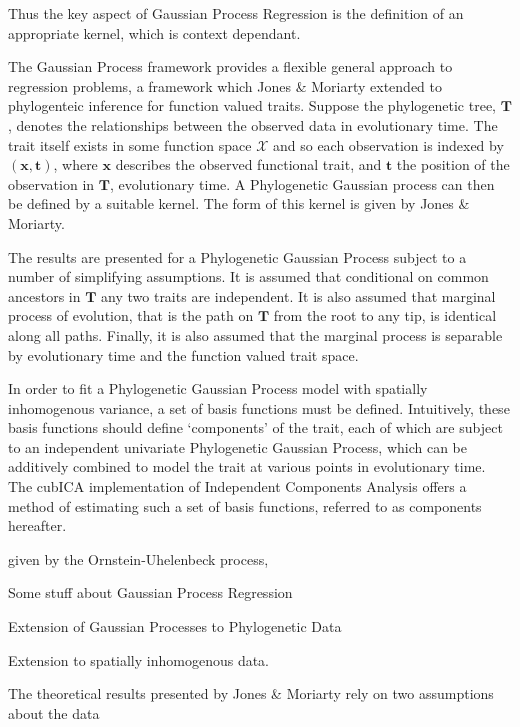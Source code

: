 \documentclass[wsdraft]{ws-rv9x6} %
\begin{document}
Thus the key aspect of Gaussian Process Regression is the definition of an appropriate kernel, which is context dependant. 

The Gaussian Process framework provides a flexible general approach to regression problems, a framework which Jones \& Moriarty extended to phylogenteic inference for function valued traits. Suppose the phylogenetic tree, \(\mathbf{T}\), denotes the relationships between the observed data in evolutionary time. The trait itself exists in some function space \(\mathcal{X}\) and so each observation is indexed by \((\mathbf{x}, \mathbf{t})\), where \(\mathbf{x}\) describes the observed functional trait, and \(\mathbf{t}\) the position of the observation in \(\mathbf{T}\), evolutionary time. A Phylogenetic Gaussian process can then be defined by a suitable kernel. The form of this kernel is given by Jones \& Moriarty.\cite{jones2013evolutionary}

The results are presented for a Phylogenetic Gaussian Process subject to a number of simplifying assumptions. It is assumed that conditional on common ancestors in \(\mathbf{T}\) any two traits are independent. It is also assumed that marginal process of evolution, that is the path on \(\mathbf{T}\) from the root to any tip, is identical along all paths. Finally, it is also assumed that the marginal process is separable by evolutionary time and the function valued trait space.

In order to fit a Phylogenetic Gaussian Process model with spatially inhomogenous variance, a set of basis functions must be defined. Intuitively, these basis functions should define `components' of the trait, each of which are subject to an independent univariate Phylogenetic Gaussian Process, which can be additively combined to model the trait at various points in evolutionary time. The cubICA\cite{blaschke2004cubica} implementation of Independent Components Analysis offers a method of estimating such a set of basis functions, referred to as components hereafter. 

given by the Ornstein-Uhelenbeck process, 

Some stuff about Gaussian Process Regression

Extension of Gaussian Processes to Phylogenetic Data

Extension to spatially inhomogenous data.

The theoretical results presented by Jones \& Moriarty\cite{jones2013evolutionary} rely on two assumptions about the data
\end{document}
